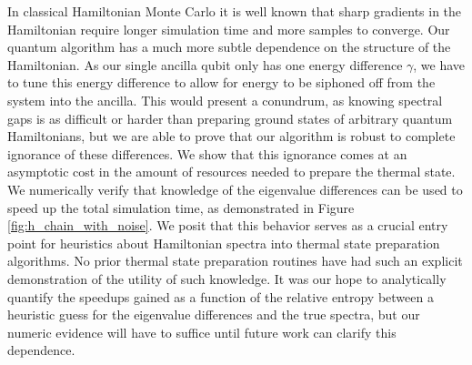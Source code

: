 \documentclass{article}
\begin{document}
In classical Hamiltonian Monte Carlo it is well known that sharp gradients in the Hamiltonian require longer simulation time and more samples to converge. Our quantum algorithm has a much more subtle dependence on the structure of the Hamiltonian. As our single ancilla qubit only has one energy difference $\gamma$, we have to tune this energy difference to allow for energy to be siphoned off from the system into the ancilla. This would present a conundrum, as knowing spectral gaps is as difficult or harder than preparing ground states of arbitrary quantum Hamiltonians, but we are able to prove that our algorithm is robust to complete ignorance of these differences. We show that this ignorance comes at an asymptotic cost in the amount of resources needed to prepare the thermal state. We numerically verify that knowledge of the eigenvalue differences can be used to speed up the total simulation time, as demonstrated in Figure \ref{fig:h_chain_with_noise}. We posit that this behavior serves as a crucial entry point for heuristics about Hamiltonian spectra into thermal state preparation algorithms. No prior thermal state preparation routines have had such an explicit demonstration of the utility of such knowledge. It was our hope to analytically quantify the speedups gained as a function of the relative entropy between a heuristic guess for the eigenvalue differences and the true spectra, but our numeric evidence will have to suffice until future work can clarify this dependence.
\end{document}

